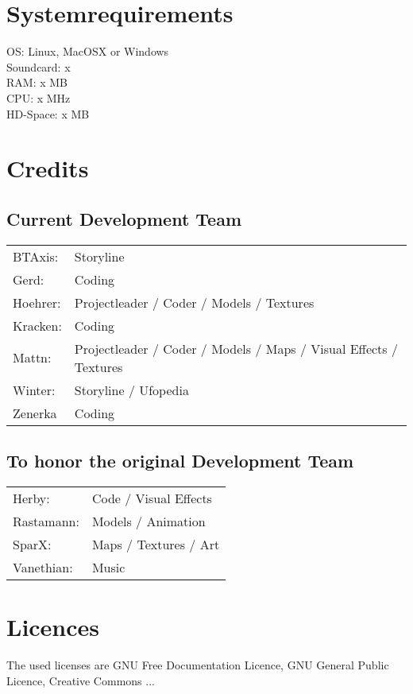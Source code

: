 \section{Systemrequirements}
OS: Linux, MacOSX or Windows\\
Soundcard: x\\
RAM: x MB\\
CPU: x MHz\\
HD-Space: x MB\\

\newpage

\section{Credits}

\subsection{Current Development Team}
\begin{tabular}{ll}
BTAxis:  	&	Storyline \\
Gerd:		&	Coding \\
Hoehrer:  	&	Projectleader / Coder / Models / Textures \\
Kracken:	&	Coding \\
Mattn:  	&	Projectleader / Coder / Models / Maps / Visual Effects / Textures \\
Winter:		&	Storyline / Ufopedia \\
Zenerka		&	Coding
\end{tabular} 

\subsection{To honor the original Development Team}
\begin{tabular}{ll}
Herby:  	&	Code / Visual Effects\\ 
Rastamann:	&	Models / Animation\\ 
SparX:  	&	Maps / Textures / Art\\ 
Vanethian:  &	Music\\ 
\end{tabular} 

\newpage

\section{Licences}
The used licenses are GNU Free Documentation Licence, GNU General Public Licence, Creative Commons ...

